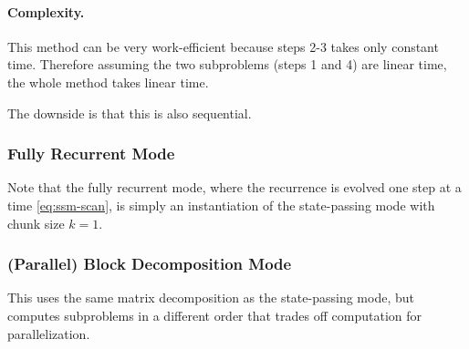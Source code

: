 \documentclass{article}
\begin{document}
\paragraph{Complexity.}
This method can be very work-efficient because steps 2-3 takes only constant time.
Therefore assuming the two subproblems (steps 1 and 4) are linear time,
the whole method takes linear time.

The downside is that this is also sequential.

\subsubsection{Fully Recurrent Mode}

Note that the fully recurrent mode, where the recurrence is evolved one step at a time \eqref{eq:ssm-scan},
is simply an instantiation of the state-passing mode with chunk size $k=1$.

\subsubsection{(Parallel) Block Decomposition Mode}

This uses the same matrix decomposition as the state-passing mode,
but computes subproblems in a different order that trades off computation for parallelization.
\end{document}
